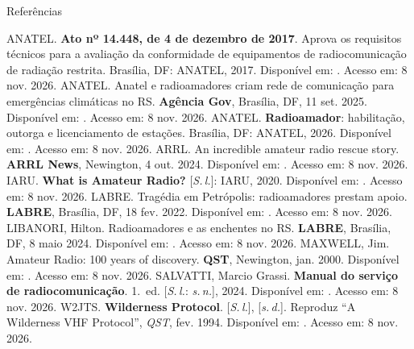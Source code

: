 \begin{frame}[t,allowframebreaks]{Referências}
  \begin{thebibliography}{}
    ANATEL. \textbf{Ato nº 14.448, de 4 de dezembro de 2017}. Aprova os requisitos técnicos para a
    avaliação da conformidade de equipamentos de radiocomunicação de radiação restrita. Brasília, DF:
    ANATEL, 2017. Disponível em: \mostrarlink{\linkAnatelAtoRUG}. Acesso em: 8 nov. 2026.
    ANATEL. Anatel e radioamadores criam rede de comunicação para emergências climáticas no RS.
    \textbf{Agência Gov}, Brasília, DF, 11 set. 2025. Disponível em: \mostrarlink{\linkAnatelRedeRS}.
    Acesso em: 8 nov. 2026.
    ANATEL. \textbf{Radioamador}: habilitação, outorga e licenciamento de estações. Brasília, DF:
    ANATEL, 2026. Disponível em: \mostrarlink{\linkAnatelRadioamador}. Acesso em: 8 nov. 2026.
    ARRL. An incredible amateur radio rescue story. \textbf{ARRL News}, Newington, 4 out. 2024.
    Disponível em: \mostrarlink{\linkARRLResgate}. Acesso em: 8 nov. 2026.
    IARU. \textbf{What is Amateur Radio?} [\emph{S.\,l.}]: IARU, 2020. Disponível em:
    \mostrarlink{\linkIARUQueE}. Acesso em: 8 nov. 2026.
    LABRE. Tragédia em Petrópolis: radioamadores prestam apoio. \textbf{LABRE}, Brasília, DF,
    18 fev. 2022. Disponível em: \mostrarlink{\linkLABREPetropolis}. Acesso em: 8 nov. 2026.
    LIBANORI, Hilton. Radioamadores e as enchentes no RS. \textbf{LABRE}, Brasília, DF, 8 maio
    2024. Disponível em: \mostrarlink{\linkLABREEnchentesRS}. Acesso em: 8 nov. 2026.
    MAXWELL, Jim. Amateur Radio: 100 years of discovery. \textbf{QST}, Newington, jan. 2000.
    Disponível em: \mostrarlink{\linkARRLCemAnos}. Acesso em: 8 nov. 2026.
    SALVATTI, Marcio Grassi. \textbf{Manual do serviço de radiocomunicação}. 1.~ed. [\emph{S.\,l.}:
    \emph{s.\,n.}], 2024. Disponível em: \mostrarlink{\linkManualSalvatti}. Acesso em: 8 nov. 2026.
    W2JTS. \textbf{Wilderness Protocol}. [\emph{S.\,l.}], [\emph{s.\,d.}]. Reproduz ``A Wilderness
    VHF Protocol'', \emph{QST}, fev. 1994. Disponível em: \mostrarlink{\linkWildernessProtocol}.
    Acesso em: 8 nov. 2026.
  \end{thebibliography}
\end{frame}

